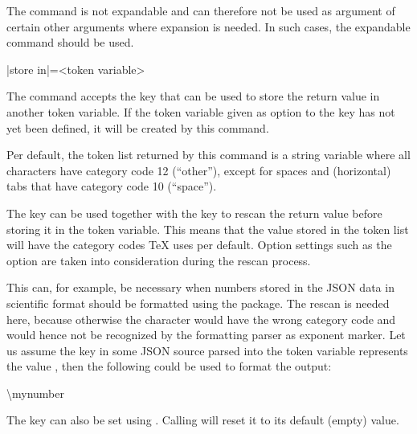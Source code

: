 \documentclass[a4paper]{article}
\begin{document}
{{\warning The command \macro{\JSONParseValue} is not expandable and can therefore not be used as argument of certain other arguments where expansion is needed. In such cases, the expandable command \macro{\JSONParseExpandableValue} should be used.

\begin{macrodef}
|store in|={<token variable>}
\end{macrodef}
The command \macro{\JSONParseValue} accepts the key  that can be used to store the return value in another token variable. If the token variable given as option to the  key has not yet been defined, it will be created by this command.

Per default, the token list returned by this command is a string variable where all characters have category code 12 (``other''), except for spaces and (horizontal) tabs that have category code 10 (``space'').

The key  can be used together with the key  to rescan the return value before storing it in the token variable. This means that the value stored in the token list will have the category codes TeX uses per default. Option settings such as the  option are taken into consideration during the rescan process.

This can, for example, be necessary when numbers stored in the JSON data in scientific format should be formatted using the  package. The rescan is needed here, because otherwise the character  would have the wrong category code and would hence not be recognized by the formatting parser as exponent marker. Let us assume the key  in some JSON source parsed into the token variable \macro{\myJSONnumber} represents the value , then the following could be used to format the output:

\begin{codeexamplecolumns}
\num{\mynumber}
\end{codeexamplecolumns}

The key  can also be set using \macro{\JSONParseSet}. Calling  will reset it to its default (empty) value.

}}
\end{document}
